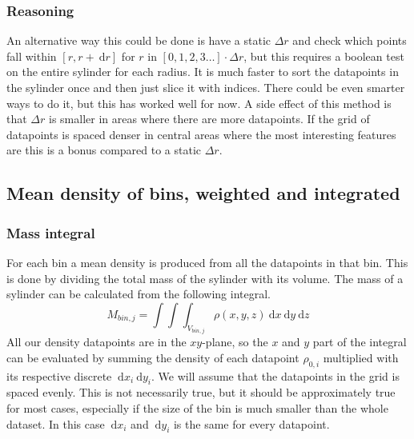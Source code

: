 \documentclass[a4paper, 12pt, english, titlepage]{article}
\newcommand{\D}[1]{\ \mathrm{d}#1} %
\begin{document}
    \subsubsection{Reasoning}
        An alternative way this could be done is have a static $\Delta r$ and check which points fall within $[r, r + \D r]$ for $r$ in $[0, 1, 2, 3 \hdots]\cdot\Delta r$, but this requires a boolean test on the entire sylinder for each radius. It is much faster to sort the datapoints in the sylinder once and then just slice it with indices. There could be even smarter ways to do it, but this has worked well for now. A side effect of this method is that $\Delta r$ is smaller in areas where there are more datapoints. If the grid of datapoints is spaced denser in central areas where the most interesting features are this is a bonus compared to a static $\Delta r$.


\subsection{Mean density of bins, weighted and integrated}
    \label{sec:bin_densities}

    \subsubsection{Mass integral}
        For each bin a mean density is produced from all the datapoints in that bin. This is done by dividing the total mass of the sylinder with its volume. The mass of a sylinder can be calculated from the following integral.
        $$
        M_{bin,j} = \int\int\int_{V_{bin,j}} \rho(x,y,z) \D{x}\D{y}\D{z}
        $$
        All our density datapoints are in the $xy$-plane, so the $x$ and $y$ part of the integral can be evaluated by summing the density of each datapoint $\rho_{0,i}$ multiplied with its respective discrete $\D{x_i}\D{y_i}$. We will assume that the datapoints in the grid is spaced evenly. This is not necessarily true, but it should be approximately true for most cases, especially if the size of the bin is much smaller than the whole dataset. In this case $\D{x_i}$ and $\D{y_i}$ is the same for every datapoint.
\end{document}

